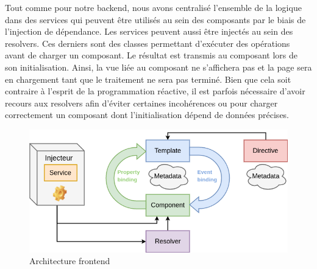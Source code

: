 	Tout comme pour notre backend, nous avons centralisé l'ensemble de la logique dans des services qui peuvent être utilisés au sein des composants par le biais de l'injection de dépendance. Les services peuvent aussi être injectés au sein des resolvers. Ces derniers sont des classes permettant d'exécuter des opérations avant de charger un composant. Le résultat est transmis au composant lors de son initialisation. Ainsi, la vue liée au composant ne s'affichera pas et la page sera en chargement tant que le traitement ne sera pas terminé. Bien que cela soit contraire à l'esprit de la programmation réactive, il est parfois nécessaire d'avoir recours aux resolvers afin d'éviter certaines incohérences ou pour charger correctement un composant dont l'initialisation dépend de données précises.

\begin{figure}[h!]
	\includegraphics[scale=0.50]{images/travailBP1818/architecture/angularArchi.png}
	\centering
	\caption{Architecture frontend}
	\label{angularArchi}
\end{figure}
